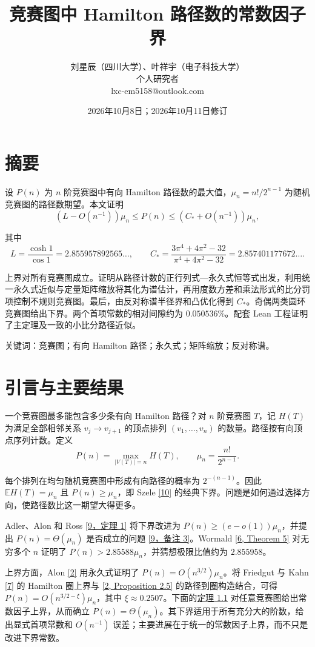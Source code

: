 \documentclass[11pt,a4paper]{article}
\title{竞赛图中 Hamilton 路径数的常数因子界}
\author{刘星辰（四川大学）、叶祥宇（电子科技大学）\\个人研究者\\lxc-em5158@outlook.com}
\date{2026年10月8日；2026年10月11日修订}
\makeatletter
\newcommand{\paperref}[2]{\hyperref[#1]{#2}}
\renewcommand{\maketitle}{\begin{center}{\LARGE\bfseries\@title\par}\vspace{1em}{\normalsize\@author\par}\vspace{0.5em}{\small\@date\par}\end{center}\vspace{1em}}
\makeatother
\begin{document}
\maketitle
\section*{摘要}
\label{sec-abstract}

设 \(P(n)\) 为 \(n\) 阶竞赛图中有向 Hamilton 路径数的最大值，\(\mu_n=n!/2^{n-1}\) 为随机竞赛图的路径数期望。本文证明
\[(L-O(n^{-1}))\mu_n\le P(n)\le(C_*+O(n^{-1}))\mu_n,\]

其中
\[L=\frac{\cosh1}{\cos1}=2.855957892565\ldots,
\qquad
C_*=\frac{3\pi^4+4\pi^2-32}{\pi^4+4\pi^2-32}
=2.857401177672\ldots.\]

上界对所有竞赛图成立。证明从路径计数的正行列式---永久式恒等式出发，利用统一永久式近似与定量矩阵缩放将其化为谱估计，再用度数方差和乘法形式的比分罚项控制不规则竞赛图。最后，由反对称谱半径界和凸优化得到 \(C_*\)。奇偶两类圆环竞赛图给出下界。两个首项常数的相对间隙约为 \(0.050536\%\)。配套 Lean 工程证明了主定理及一致的小比分路径近似。

关键词：竞赛图；有向 Hamilton 路径；永久式；矩阵缩放；反对称谱。

\section{引言与主要结果}\label{sec-1}

一个竞赛图最多能包含多少条有向 Hamilton 路径？对 \(n\) 阶竞赛图 \(T\)，记 \(H(T)\) 为满足全部相邻关系 \(v_j\to v_{j+1}\) 的顶点排列 \((v_1,\ldots,v_n)\) 的数量。路径按有向顶点序列计数。定义
\[P(n)=\max_{|V(T)|=n}H(T),\qquad \mu_n=\frac{n!}{2^{n-1}}.\]

每个排列在均匀随机竞赛图中形成有向路径的概率为 \(2^{-(n-1)}\)。因此 \(\mathbb E H(T)=\mu_n\) 且 \(P(n)\ge\mu_n\)，即 Szele \paperref{bib-10}{[10]} 的经典下界。问题是如何通过选择方向，使路径数比这一期望大得更多。

Adler、Alon 和 Ross \paperref{bib-9}{[9，定理 1]} 将下界改进为 \(P(n)\ge(e-o(1))\mu_n\)，并提出 \(P(n)=\Theta(\mu_n)\) 是否成立的问题 \paperref{bib-9}{[9，备注 3]}。Wormald \paperref{bib-6}{[6, Theorem 5]} 对无穷多个 \(n\) 证明了 \(P(n)>2.85588\mu_n\)，并猜想极限比值约为 \(2.855958\)。

上界方面，Alon \paperref{bib-2}{[2]} 用永久式证明了 \(P(n)=O(n^{3/2})\mu_n\)。将 Friedgut 与 Kahn \paperref{bib-7}{[7]} 的 Hamilton 圈上界与 \paperref{bib-2}{[2, Proposition 2.5]} 的路径到圈构造结合，可得 \(P(n)=O(n^{3/2-\xi})\mu_n\)，其中 \(\xi\approx0.2507\)。下面的\paperref{thm-1.1}{定理 1.1} 对任意竞赛图给出常数因子上界，从而确立 \(P(n)=\Theta(\mu_n)\)。其下界适用于所有充分大的阶数，给出显式首项常数和 \(O(n^{-1})\) 误差；主要进展在于统一的常数因子上界，而不只是改进下界常数。
\end{document}
